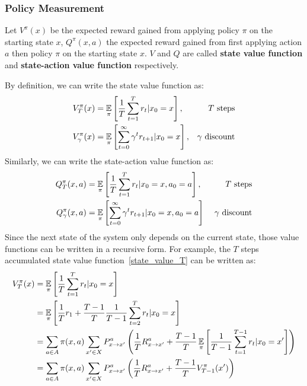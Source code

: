 \subsubsection{Policy Measurement}
Let $V^\pi(x)$ be the expected reward gained from applying policy $\pi$ on the starting state $x$, 
$Q^\pi(x, a)$ the expected reward gained from first applying action $a$ then policy $\pi$ on the starting
state $x$. $V$ and $Q$ are called \textbf{state value function} and \textbf{state-action value function}
respectively. \par
By definition, we can write the state value function as:
\begin{align}
    V^\pi_T(x) &= \operatorname*{\mathbb{E}}_\pi\left[\frac{1}{T}\sum_{t=1}^{T}r_t | x_0 = x\right], &\text{$T$ steps}
    \label{state_value_T}\\
    V^\pi_\gamma(x) &= \operatorname*{\mathbb{E}}_\pi\left[\sum_{t=0}^{\infty} \gamma^t r_{t+1} | x_0 = x\right], &\text{$\gamma$ 
    discount}\label{state_value_gamma}
\end{align}
Similarly, we can write the state-action value function as:
\begin{align}
    Q^\pi_T(x, a) &= \operatorname*{\mathbb{E}}_\pi\left[\frac{1}{T}\sum_{t=1}^T r_t | x_0 = x, a_0 = a\right], &\text{$T$ steps}
    \label{state-action_value_T}\\
    Q^\pi_\gamma(x, a) &= \operatorname*{\mathbb{E}}_\pi\left[\sum_{t=0}^\infty \gamma^t r_{t+1} | x_0 = x, a_0 = a\right] &\text{
    $\gamma$ discount}\label{state-action_value_gamma}
\end{align}
Since the next state of the system only depends on the current state, those value functions can be written in
a recursive form. For example, the $T$ steps accumulated state value function~\eqref{state_value_T} can be 
written as:
\begin{align}
    V^\pi_T(x) &= \operatorname*{\mathbb{E}}_\pi \left[\frac{1}{T}\sum_{t=1}^T r_t | x_0 = x\right]\nonumber\\
               &= \operatorname*{\mathbb{E}}_\pi \left[\frac{1}{T} r_1 + \frac{T-1}{T}\frac{1}{T-1}\sum_{t=2}^T r_t | x_0 = x\right]
               \nonumber\\
               &= \sum_{a\in A}\pi(x, a)\sum_{x'\in X}P_{x\rightarrow x'}^a\left(\frac{1}{T}
               R_{x\rightarrow x'}^a + \frac{T-1}{T}\operatorname*{\mathbb{E}}_\pi\left[\frac{1}{T-1}\sum_{t=1}^{T-1}r_t | x_0=x'
               \right]\right)\nonumber\\
               &= \sum_{a\in A}\pi(x, a)\sum_{x'\in X}P_{x\rightarrow x'}^a\left(\frac{1}{T}
               R_{x\rightarrow x'}^a + \frac{T-1}{T} V^\pi_{T-1}(x')\right)
\end{align}
